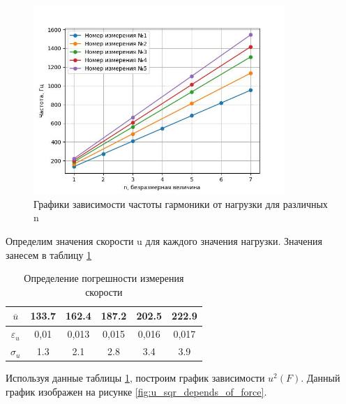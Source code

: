 \documentclass[12pt,a4paper]{article}
\begin{document}
\begin{figure}[h!]
	\begin{center}
		\includegraphics[width = 0.85\textwidth]{res1}
		\caption{Графики зависимости частоты гармоники от нагрузки для различных n}
		\label{fig:grapfic_frequency_force_depend}
	\end{center}
\end{figure}

Определим значения скорости u для каждого значения нагрузки. Значения занесем в таблицу \ref{tab:velocity_with_mistakes}

\begin{table}[h]
\centering
\begin{tabular}{|c|c|c|c|c|c|}
\hline
$\overline{u}$  & 133.7 & 162.4 & 187.2 & 202.5 & 222.9 \\ \hline
$\varepsilon_{u}$   & 0,01 & 0,013 & 0,015 & 0,016 & 0,017  \\ \hline
$\sigma_{u}$     & 1.3   & 2.1   & 2.8   & 3.4   & 3.9  \\ \hline

\end{tabular}
\caption{Определение погрешности измерения скорости}
\label{tab:velocity_with_mistakes}
\end{table}

Используя данные таблицы \ref{tab:velocity_with_mistakes}, построим график зависимости $u^{2}\left(F\right)$. Данный график изображен на рисунке \ref{fig:u_sqr_depends_of_force}.
\end{document}
